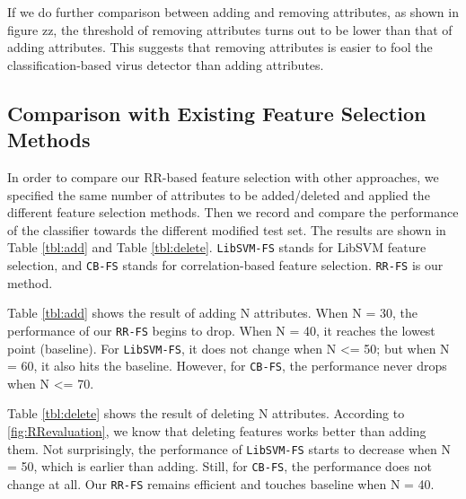 \documentclass[11pt]{article}
\begin{document}
If we do further comparison between adding and removing attributes, as shown in figure zz, the threshold of removing attributes turns out to be lower than that of adding attributes. This suggests that removing attributes is easier to fool the classification-based virus detector than adding attributes.

\subsection{Comparison with Existing Feature Selection Methods}
In order to compare our RR-based feature selection with other approaches, we specified the same number of attributes to be added/deleted and applied the different feature selection methods. Then we record and compare the performance of the classifier towards the different modified test set. The results are shown in Table \ref{tbl:add} and Table \ref{tbl:delete}. \texttt{LibSVM-FS} stands for LibSVM feature selection, and \texttt{CB-FS} stands for correlation-based feature selection. \texttt{RR-FS} is our method.

Table \ref{tbl:add} shows the result of adding N attributes. When N = 30, the performance of our \texttt{RR-FS} begins to drop. When N = 40, it reaches the lowest point (baseline). For \texttt{LibSVM-FS}, it does not change when N <= 50; but when N = 60, it also hits the baseline. However, for \texttt{CB-FS}, the performance never drops when N <= 70.


Table \ref{tbl:delete} shows the result of deleting N attributes. According to \ref{fig:RRevaluation}, we know that deleting features works better than adding them. Not surprisingly,  the performance of \texttt{LibSVM-FS} starts to decrease when N = 50, which is earlier than adding. Still, for \texttt{CB-FS}, the performance does not change at all. Our \texttt{RR-FS} remains efficient and touches baseline when N = 40.
\end{document}
